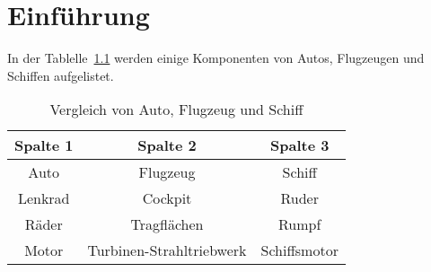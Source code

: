 \documentclass[12pt,a4paper,final]{scrbook}
\begin{document}
\chapter{Einführung}
In der Tablelle~\ref{VergleichAFS} werden einige Komponenten von Autos, Flugzeugen und Schiffen aufgelistet.

\begin{table}[htb]
\centering
\begin{tabular}{ccc}
	\toprule
	Spalte 1 & Spalte 2 & Spalte 3 \\
	\midrule
	Auto    & Flugzeug    & Schiff \\
	Lenkrad & Cockpit     & Ruder \\
	Räder   & Tragflächen & Rumpf \\
	Motor   & Turbinen-Strahltriebwerk & Schiffsmotor \\
	\bottomrule 
\end{tabular} 
\caption{Vergleich von Auto, Flugzeug und Schiff}
\label{VergleichAFS}
\end{table} 
\end{document}

